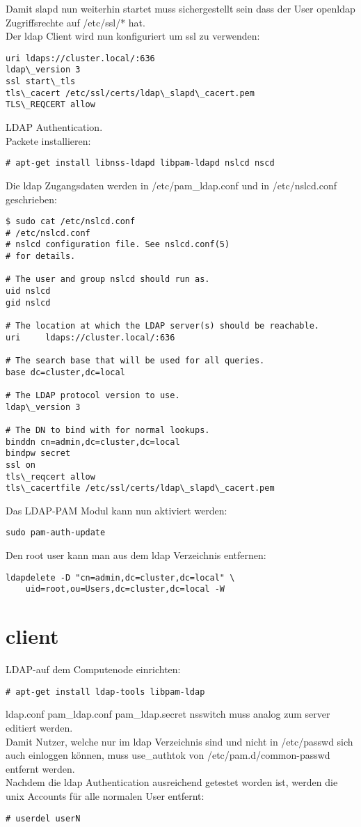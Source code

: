 Damit slapd nun weiterhin startet muss sichergestellt sein dass der User openldap Zugriffsrechte auf /etc/ssl/* hat.\\
Der ldap Client wird nun konfiguriert um ssl zu verwenden:
\begin{lstlisting}[style=Bash]
uri ldaps://cluster.local/:636
ldap\_version 3
ssl start\_tls
tls\_cacert /etc/ssl/certs/ldap\_slapd\_cacert.pem
TLS\_REQCERT allow
\end{lstlisting}
LDAP Authentication.\\
Packete installieren:
\begin{lstlisting}[style=Bash]
# apt-get install libnss-ldapd libpam-ldapd nslcd nscd
\end{lstlisting}
Die ldap Zugangsdaten werden in /etc/pam\_ldap.conf und in /etc/nslcd.conf geschrieben:
\begin{lstlisting}[style=Bash]
$ sudo cat /etc/nslcd.conf 
# /etc/nslcd.conf
# nslcd configuration file. See nslcd.conf(5)
# for details.

# The user and group nslcd should run as.
uid nslcd
gid nslcd

# The location at which the LDAP server(s) should be reachable.
uri     ldaps://cluster.local/:636

# The search base that will be used for all queries.
base dc=cluster,dc=local

# The LDAP protocol version to use.
ldap\_version 3

# The DN to bind with for normal lookups.
binddn cn=admin,dc=cluster,dc=local
bindpw secret
ssl on
tls\_reqcert allow
tls\_cacertfile /etc/ssl/certs/ldap\_slapd\_cacert.pem
\end{lstlisting}
Das LDAP-PAM Modul kann nun aktiviert werden: 
\begin{lstlisting}[style=Bash]
sudo pam-auth-update
\end{lstlisting}
Den root user kann man aus dem ldap Verzeichnis entfernen:
\begin{lstlisting}[style=Bash]
ldapdelete -D "cn=admin,dc=cluster,dc=local" \
	uid=root,ou=Users,dc=cluster,dc=local -W
\end{lstlisting}
\section{client}
LDAP-auf dem Computenode einrichten:
\begin{lstlisting}[style=Bash]
# apt-get install ldap-tools libpam-ldap
\end{lstlisting}
{ldap.conf pam\_ldap.conf pam\_ldap.secret nsswitch} muss analog zum server editiert werden.\\
Damit Nutzer, welche nur im ldap Verzeichnis sind und nicht in /etc/passwd sich auch einloggen können, muss use\_authtok von /etc/pam.d/common-passwd entfernt werden.\\
Nachdem die ldap Authentication ausreichend getestet worden ist, werden die unix Accounts für alle normalen User entfernt: 
\begin{lstlisting}[style=Bash]
# userdel userN
\end{lstlisting}
